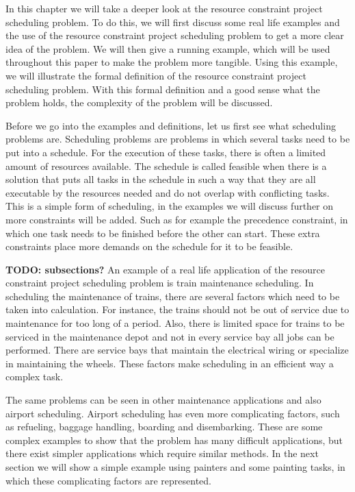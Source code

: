 \documentclass{article}
\theoremstyle{definition}
\newcommand{\TODO}[1]{{\color{red}\textbf{TODO: #1}}}
\begin{document}
In this chapter we will take a deeper look at the resource constraint project scheduling problem.
To do this, we will first discuss some real life examples and the use of the resource constraint project scheduling problem to get a more clear idea of the problem.
We will then give a running example, which will be used throughout this paper to make the problem more tangible.
Using this example, we will illustrate the formal definition of the resource constraint project scheduling problem.
With this formal definition and a good sense what the problem holds, the complexity of the problem will be discussed.

Before we go into the examples and definitions, let us first see what scheduling problems are.
Scheduling problems are problems in which several tasks need to be put into a schedule.
For the execution of these tasks, there is often a limited amount of resources available.
The schedule is called feasible when there is a solution that puts all tasks in the schedule in such a way that they are all executable by the resources needed and do not overlap with conflicting tasks.
This is a simple form of scheduling, in the examples we will discuss further on more constraints will be added.
Such as for example the precedence constraint, in which one task needs to be finished before the other can start.
These extra constraints place more demands on the schedule for it to be feasible.

\TODO{subsections?}
An example of a real life application of the resource constraint project scheduling problem is train maintenance scheduling.
In scheduling the maintenance of trains, there are several factors which need to be taken into calculation.
For instance, the trains should not be out of service due to maintenance for too long of a period.
Also, there is limited space for trains to be serviced in the maintenance depot and not in every service bay all jobs can be performed.
There are service bays that maintain the electrical wiring or specialize in maintaining the wheels.
These factors make scheduling in an efficient way a complex task.

The same problems can be seen in other maintenance applications and also airport scheduling.
Airport scheduling has even more complicating factors, such as refueling, baggage handling, boarding and disembarking.
These are some complex examples to show that the problem has many difficult applications, but there exist simpler applications which require similar methods.
In the next section we will show a simple example using painters and some painting tasks, in which these complicating factors are represented.
\end{document}
